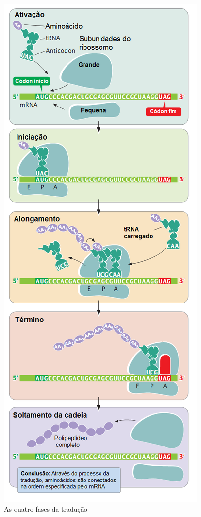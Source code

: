 \begin{figure}[H]
    \centering
    \includegraphics[scale=0.7]{./figuras/sintese_proteina.png}
    \caption{As quatro fases da tradução}
    \label{fig:sintese_proteina}
\end{figure}



